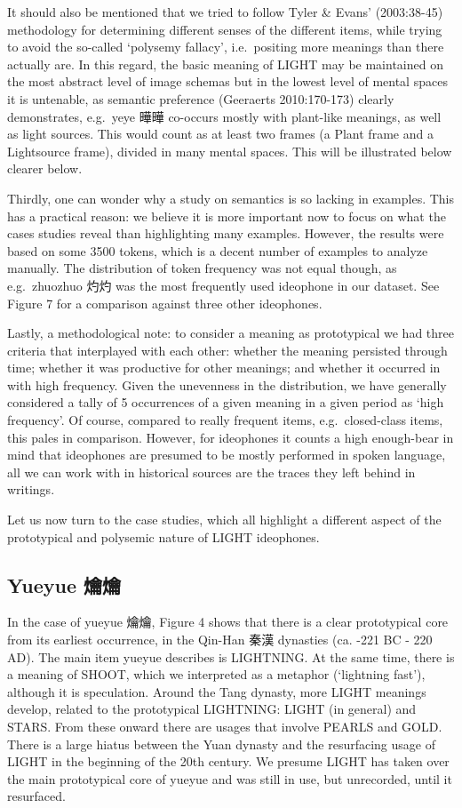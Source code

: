It should also be mentioned that we tried to follow Tyler \& Evans'
(2003:38-45) methodology for determining different senses of the
different items, while trying to avoid the so-called `polysemy fallacy',
i.e.~positing more meanings than there actually are. In this regard, the
basic meaning of LIGHT may be maintained on the most abstract level of
image schemas but in the lowest level of mental spaces it is untenable,
as semantic preference (Geeraerts 2010:170-173) clearly demonstrates,
e.g.~yeye 曄曄 co-occurs mostly with plant-like meanings, as well as
light sources. This would count as at least two frames (a Plant frame
and a Lightsource frame), divided in many mental spaces. This will be
illustrated below clearer below.

Thirdly, one can wonder why a study on semantics is so lacking in
examples. This has a practical reason: we believe it is more important
now to focus on what the cases studies reveal than highlighting many
examples. However, the results were based on some 3500 tokens, which is
a decent number of examples to analyze manually. The distribution of
token frequency was not equal though, as e.g.~zhuozhuo 灼灼 was the most
frequently used ideophone in our dataset. See Figure 7 for a comparison
against three other ideophones.

Lastly, a methodological note: to consider a meaning as prototypical we
had three criteria that interplayed with each other: whether the meaning
persisted through time; whether it was productive for other meanings;
and whether it occurred in with high frequency. Given the unevenness in
the distribution, we have generally considered a tally of 5 occurrences
of a given meaning in a given period as `high frequency'. Of course,
compared to really frequent items, e.g.~closed-class items, this pales
in comparison. However, for ideophones it counts a high enough-bear in
mind that ideophones are presumed to be mostly performed in spoken
language, all we can work with in historical sources are the traces they
left behind in writings.

Let us now turn to the case studies, which all highlight a different
aspect of the prototypical and polysemic nature of LIGHT ideophones.

\subsection{Yueyue 爚爚}\label{yueyue-}

In the case of yueyue 爚爚, Figure 4 shows that there is a clear
prototypical core from its earliest occurrence, in the Qin-Han 秦漢
dynasties (ca. -221 BC - 220 AD). The main item yueyue describes is
LIGHTNING. At the same time, there is a meaning of SHOOT, which we
interpreted as a metaphor (`lightning fast'), although it is
speculation. Around the Tang dynasty, more LIGHT meanings develop,
related to the prototypical LIGHTNING: LIGHT (in general) and STARS.
From these onward there are usages that involve PEARLS and GOLD. There
is a large hiatus between the Yuan dynasty and the resurfacing usage of
LIGHT in the beginning of the 20th century. We presume LIGHT has taken
over the main prototypical core of yueyue and was still in use, but
unrecorded, until it resurfaced.

